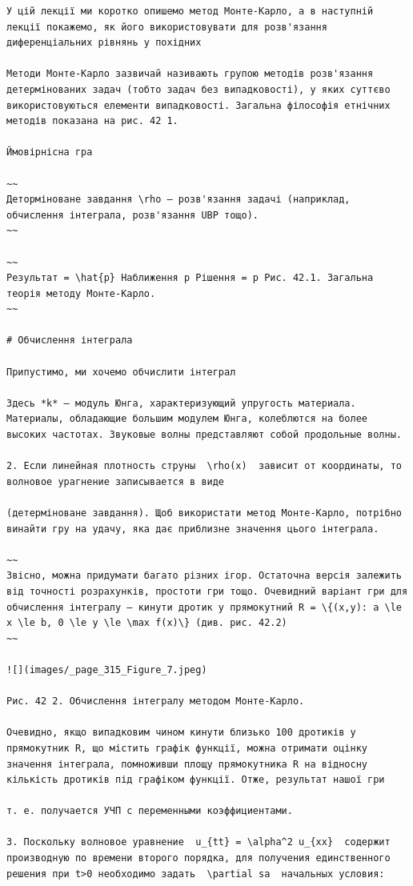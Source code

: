\documentclass[
  ukrainian,
]{article}
\begin{document}
\begin{verbatim}
У цій лекції ми коротко опишемо метод Монте-Карло, а в наступній лекції покажемо, як його використовувати для розв'язання диференціальних рівнянь у похідних

Методи Монте-Карло зазвичай називають групою методів розв'язання детермінованих задач (тобто задач без випадковості), у яких суттєво використовуються елементи випадковості. Загальна філософія етнічних методів показана на рис. 42 1.

Ймовірнісна гра

~~
Деторміноване завдання \rho — розв'язання задачі (наприклад, обчислення інтеграла, розв'язання UBP тощо).
~~

~~
Результат = \hat{p} Наближення p Рішення = p Рис. 42.1. Загальна теорія методу Монте-Карло.
~~

# Обчислення інтеграла

Припустимо, ми хочемо обчислити інтеграл

Здесь *k* — модуль Юнга, характеризующий упругость материала. Материалы, обладающие большим модулем Юнга, колеблются на более высоких частотах. Звуковые волны представляют собой продольные волны.

2. Если линейная плотность струны  \rho(x)  зависит от координаты, то волновое урагнение записывается в виде

(детерміноване завдання). Щоб використати метод Монте-Карло, потрібно винайти гру на удачу, яка дає приблизне значення цього інтеграла.

~~
Звісно, можна придумати багато різних ігор. Остаточна версія залежить від точності розрахунків, простоти гри тощо. Очевидний варіант гри для обчислення інтегралу — кинути дротик у прямокутний R = \{(x,y): a \le x \le b, 0 \le y \le \max f(x)\} (див. рис. 42.2)
~~

![](images/_page_315_Figure_7.jpeg)

Рис. 42 2. Обчислення інтегралу методом Монте-Карло.

Очевидно, якщо випадковим чином кинути близько 100 дротиків у прямокутник R, що містить графік функції, можна отримати оцінку значення інтеграла, помноживши площу прямокутника R на відносну кількість дротиків під графіком функції. Отже, результат нашої гри

т. е. получается УЧП с переменными коэффициентами.

3. Поскольку волновое уравнение  u_{tt} = \alpha^2 u_{xx}  содержит производную по времени второго порядка, для получения единственного решения при t>0 необходимо задать  \partial sa  начальных условия:


\end{verbatim}
\end{document}
